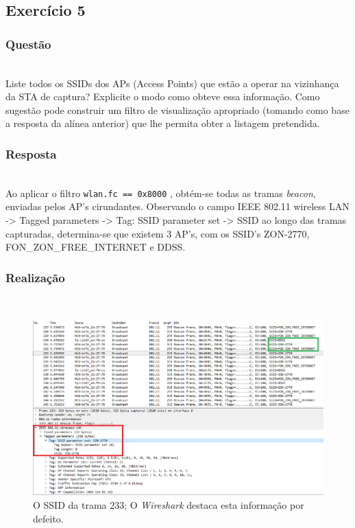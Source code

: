 \documentclass{llncs}
\begin{document}
\clearpage
\subsection{Exercício 5}
\subsubsection{Questão}\rule[-10pt]{0pt}{10pt}\\

Liste todos os SSIDs dos APs (Access Points) que estão a operar na vizinhança da STA de captura? Explicite o modo como obteve essa informação. Como sugestão pode construir um filtro de visualização apropriado (tomando como base a resposta da alínea anterior) que lhe permita obter a listagem pretendida.

\subsubsection{Resposta}\rule[-10pt]{0pt}{10pt}\\

Ao aplicar o filtro \texttt{wlan.fc == 0x8000} , obtém-se todas as tramas \textit{beacon}, enviadas pelos AP's cirundantes. Observando o campo IEEE 802.11 wireless LAN -> Tagged parameters -> Tag: SSID parameter set -> SSID ao longo das tramas capturadas, determina-se que existem 3 AP's, com os SSID's ZON-2770, FON_ZON_FREE_INTERNET e DDSS.

\subsubsection{Realização}\rule[-10pt]{0pt}{10pt}\\

\begin{figure}
  \begin{center}
  \includegraphics[scale=0.35]{imagens/SSID.png} 
  \end{center}
  \caption{O SSID da trama 233; O \textit{Wireshark} destaca esta informação por defeito.}
  \label{fig:type_field}
\end{figure}
\end{document}
